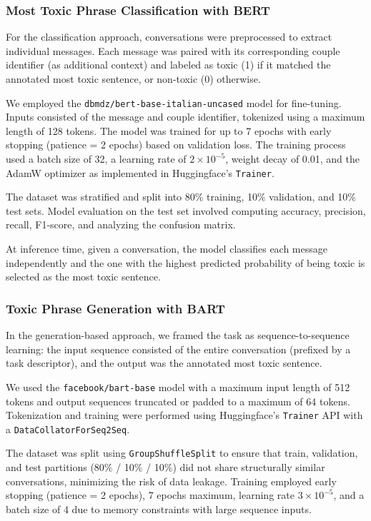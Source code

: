 \documentclass[conference]{IEEEtran}
\begin{document}
\subsubsection{Most Toxic Phrase Classification with BERT}

For the classification approach, conversations were preprocessed to extract individual messages. Each message was paired with its corresponding couple identifier (as additional context) and labeled as toxic (1) if it matched the annotated most toxic sentence, or non-toxic (0) otherwise.

We employed the \texttt{dbmdz/bert-base-italian-uncased} model for fine-tuning. Inputs consisted of the message and couple identifier, tokenized using a maximum length of 128 tokens. The model was trained for up to 7 epochs with early stopping (patience = 2 epochs) based on validation loss. The training process used a batch size of 32, a learning rate of $2 \times 10^{-5}$, weight decay of 0.01, and the AdamW optimizer as implemented in Huggingface's \texttt{Trainer}. 

The dataset was stratified and split into 80\% training, 10\% validation, and 10\% test sets. Model evaluation on the test set involved computing accuracy, precision, recall, F1-score, and analyzing the confusion matrix.

At inference time, given a conversation, the model classifies each message independently and the one with the highest predicted probability of being toxic is selected as the most toxic sentence.

\subsubsection{Toxic Phrase Generation with BART}

In the generation-based approach, we framed the task as sequence-to-sequence learning: the input sequence consisted of the entire conversation (prefixed by a task descriptor), and the output was the annotated most toxic sentence. 

We used the \texttt{facebook/bart-base} model with a maximum input length of 512 tokens and output sequences truncated or padded to a maximum of 64 tokens. Tokenization and training were performed using Huggingface's \texttt{Trainer} API with a \texttt{DataCollatorForSeq2Seq}.

The dataset was split using \texttt{GroupShuffleSplit} to ensure that train, validation, and test partitions (80\% / 10\% / 10\%) did not share structurally similar conversations, minimizing the risk of data leakage. Training employed early stopping (patience = 2 epochs), 7 epochs maximum, learning rate $3 \times 10^{-5}$, and a batch size of 4 due to memory constraints with large sequence inputs.
\end{document}
